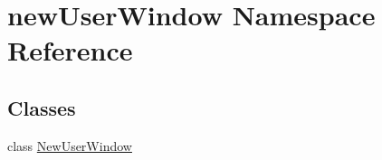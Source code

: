 \hypertarget{namespacenew_user_window}{}\section{new\+User\+Window Namespace Reference}
\label{namespacenew_user_window}
\subsection*{Classes}
\begin{DoxyCompactItemize}
\item 
class \mbox{\hyperlink{classnew_user_window_1_1_new_user_window}{New\+User\+Window}}
\end{DoxyCompactItemize}
